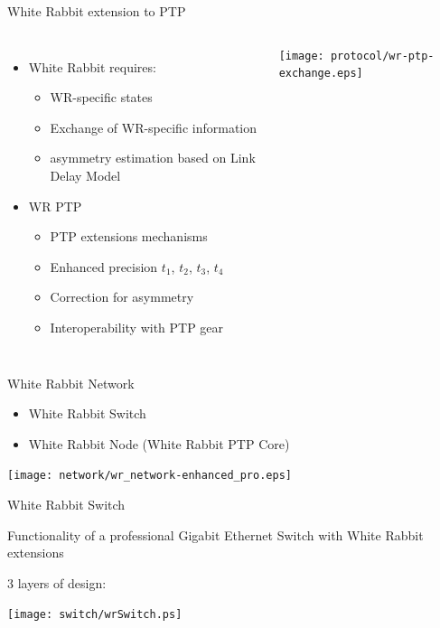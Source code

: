 \documentclass[compress,red]{beamer}
\begin{document}
\begin{frame}{White Rabbit extension to PTP}

\begin{columns}[c]
    \begin{itemize}
	\item White Rabbit requires:
	  \begin{itemize}
	    \item WR-specific states
	    \item Exchange of WR-specific information
      \item asymmetry estimation based on Link Delay Model
	  \end{itemize}
	\item WR PTP
	  \begin{itemize}
	    \item PTP extensions mechanisms
	    \item Enhanced precision $t_1$, $t_2$, $t_3$, $t_4$
	    \item Correction for asymmetry
	    \item Interoperability with PTP gear
	  \end{itemize}
  \end{itemize}
	\begin{center}
	\texttt{[image: protocol/wr-ptp-exchange.eps]}
	\end{center}
\end{columns}

\end{frame}

\begin{frame}{White Rabbit Network}
    \begin{itemize}
      \item White Rabbit Switch
      \item White Rabbit Node (White Rabbit PTP Core)
    \end{itemize}
    \begin{center}
    \texttt{[image: network/wr\_network-enhanced\_pro.eps]}
    \end{center}
\end{frame}

\begin{frame}{White Rabbit Switch}
	\begin{block}{Functionality of a professional Gigabit Ethernet Switch}
	with White Rabbit extensions
	\end{block}
	\begin{block}{3 layers of design:}
	\begin{center}
	\texttt{[image: switch/wrSwitch.ps]}
	\end{center}
	\end{block}
\end{frame}
\end{document}
